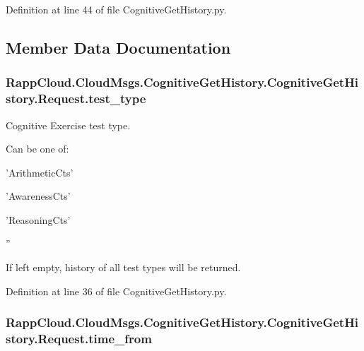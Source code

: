 Definition at line 44 of file Cognitive\-Get\-History.\-py.



\subsection{Member Data Documentation}
\hypertarget{classRappCloud_1_1CloudMsgs_1_1CognitiveGetHistory_1_1CognitiveGetHistory_1_1Request_aa76b643781c5055acb1825220b2a4650}{
\subsubsection[{test\-\_\-type}]{\setlength{\rightskip}{0pt plus 5cm}Rapp\-Cloud.\-Cloud\-Msgs.\-Cognitive\-Get\-History.\-Cognitive\-Get\-History.\-Request.\-test\-\_\-type}}\label{classRappCloud_1_1CloudMsgs_1_1CognitiveGetHistory_1_1CognitiveGetHistory_1_1Request_aa76b643781c5055acb1825220b2a4650}


Cognitive Exercise test type. 

Can be one of\-:
\begin{DoxyItemize}
\item 'Arithmetic\-Cts'
\item 'Awareness\-Cts'
\item 'Reasoning\-Cts'
\item ''
\end{DoxyItemize}

If left empty, history of all test types will be returned. 

Definition at line 36 of file Cognitive\-Get\-History.\-py.

\hypertarget{classRappCloud_1_1CloudMsgs_1_1CognitiveGetHistory_1_1CognitiveGetHistory_1_1Request_a896a59c9fdfce2c674dbe2803db0ffca}{
\subsubsection[{time\-\_\-from}]{\setlength{\rightskip}{0pt plus 5cm}Rapp\-Cloud.\-Cloud\-Msgs.\-Cognitive\-Get\-History.\-Cognitive\-Get\-History.\-Request.\-time\-\_\-from}}\label{classRappCloud_1_1CloudMsgs_1_1CognitiveGetHistory_1_1CognitiveGetHistory_1_1Request_a896a59c9fdfce2c674dbe2803db0ffca}



